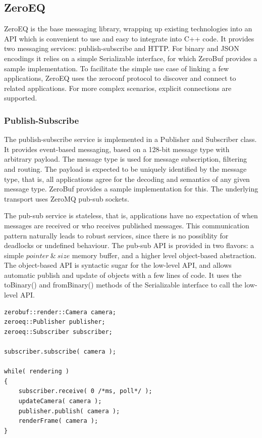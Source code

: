 \documentclass[10pt]{llncs}
\begin{document}
\subsection{ZeroEQ}

ZeroEQ is the base messaging library, wrapping up existing technologies into an
API which is convenient to use and easy to integrate into C++ code. It provides
two messaging services: publish-subscribe and HTTP. For binary and JSON
encodings it relies on a simple \textsf{Serializable} interface, for which
ZeroBuf provides a sample implementation. To facilitate the simple use case of
linking a few applications, ZeroEQ uses the zeroconf protocol to discover and
connect to related applications. For more complex scenarios, explicit
connections are supported.

\subsubsection{Publish-Subscribe}

The publish-subscribe service is implemented in a \textsf{Publisher} and
\textsf{Subscriber} class. It provides event-based messaging, based on a 128-bit
message type with arbitrary payload. The message type is used for message
subscription, filtering and routing. The payload is expected to be uniquely
identified by the message type, that is, all applications agree for the decoding
and semantics of any given message type. ZeroBuf provides a sample
implementation for this. The underlying transport uses ZeroMQ pub-sub sockets.

The pub-sub service is stateless, that is, applications have no expectation of
when messages are received or who receives published messages. This
communication pattern naturally leads to robust services, since there is no
possiblity for deadlocks or undefined behaviour. The pub-sub API is provided in
two flavors: a simple $pointer\ \&\ size$ memory buffer, and a higher level
object-based abstraction. The object-based API is syntactic sugar for the
low-level API, and allows automatic publish and update of objects with a few
lines of code. It uses the \textsf{toBinary()} and \textsf{fromBinary()} methods
of the \textsf{Serializable} interface to call the low-level API.

\begin{lstlisting}[float, caption=Publish-Subscribe Example, label=lPubSub]
zerobuf::render::Camera camera;
zeroeq::Publisher publisher;
zeroeq::Subscriber subscriber;

subscriber.subscribe( camera );

while( rendering )
{
    subscriber.receive( 0 /*ms, poll*/ );
    updateCamera( camera );
    publisher.publish( camera );
    renderFrame( camera );
}
\end{lstlisting}
\end{document}
